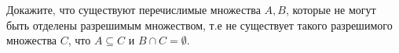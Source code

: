 Докажите, что существуют перечислимые множества $A, B$, которые не могут быть отделены разрешимым множеством, т.е не
существует такого разрешимого множества $C$, что $A \subseteq C$ и $B \cap C = \emptyset$.